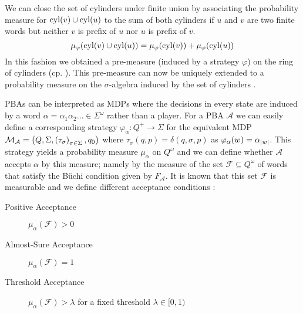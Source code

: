We can close the set of cylinders under finite union by associating
the probability measure for $\operatorname{cyl}(v)\cup\operatorname{cyl}(u)$ to the sum of both cylinders
if $u$ and $v$ are two finite words but neither $v$ is prefix of $u$ nor $u$
is prefix of $v$.
\begin{equation}
  \mu_{\varphi}(\operatorname{cyl}(v)\cup\operatorname{cyl}(u)) = \mu_{\varphi}(\operatorname{cyl}(v)) 
  + \mu_{\varphi}(\operatorname{cyl}(u))
\end{equation}
In this fashion we obtained a pre-measure (induced by a strategy $\varphi$) on
the ring of cylinders (cp. \cite[Chapter 1 and Chapter 3]{Bauer}). This
pre-measure can now be uniquely extended to a probability measure on the
$\sigma$-algebra induced by the set of cylinders \cite[Theorem 5.4]{Bauer}.

\acp{PBA} can be interpreted as \acp{MDP} where the decisions in every state
are induced by a word $\alpha = \alpha_{1}\alpha_{2}\dots\in\Sigma^{\omega}$
rather than a player. For a \ac{PBA} $\mathcal{A}$ we can easily define a
corresponding strategy $\varphi_{\alpha}:Q^{+}\rightarrow\Sigma$ for the
equivalent \ac{MDP} $\mathcal{M}_{\mathcal{A}} =
   \left(Q, \Sigma, \left(\tau_{\sigma}\right)_{\sigma\in\Sigma}, q_{0}\right)$
where $\tau_{\sigma}(q,p) = \delta(q,\sigma,p)$ as
$\varphi_{\alpha}(w) = \alpha_{\left\vert{w}\right\vert}$. This strategy yields a probability
measure $\mu_{\alpha}$ on $Q^{\omega}$ and we can define whether $\mathcal{A}$ 
accepts $\alpha$ by this measure; namely by the measure of the set
$\mathcal{F}\subseteq Q^{\omega}$ of words that satisfy the Büchi condition
given by $F_{\mathcal{A}}$. It is known that this set $\mathcal{F}$ is
measurable and we define different acceptance conditions \cite{Groesser}:
\begin{description}
  \item [Positive Acceptance] $\mu_{\alpha}(\mathcal{F}) > 0$
  \item [Almost-Sure Acceptance] $\mu_{\alpha}(\mathcal{F}) = 1$
  \item [Threshold Acceptance] $\mu_{\alpha}(\mathcal{F}) > \lambda$ for a
    fixed threshold $\lambda\in[0, 1)$
\end{description}

